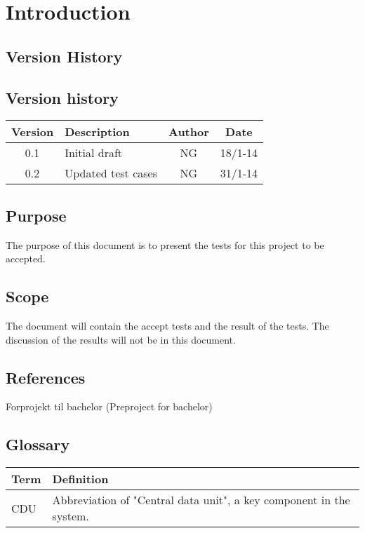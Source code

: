 \chapter{Introduction}
\section{Version History}
\section{Version history}
\begin{table}[H]
\begin{tabular}{|c|p{9cm}|c|c|}
\hline
Version & Description & Author & Date\\
\hline
0.1 & Initial draft & NG & 18/1-14\\
\hline
0.2 & Updated test cases & NG & 31/1-14\\
\hline
\end{tabular}
\end{table}

\section{Purpose}
The purpose of this document is to present the tests for this project to be accepted.

\section{Scope}
The document will contain the accept tests and the result of the tests. The discussion of the results will not be in this document.

\section{References}
Forprojekt til bachelor (Preproject for bachelor)

\section{Glossary}
\begin{table}[H]
\centering
\begin{tabular}{|p{4cm}|p{7cm}|}
\hline
Term & Definition\\ \hline
CDU & Abbreviation of "Central data unit", a key component in the system. \\ \hline
\end{tabular}
\end{table}
